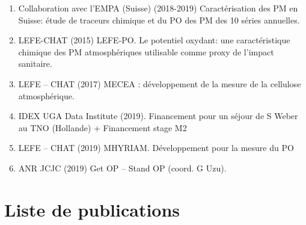 \documentclass[a4paper,11pt]{book}
\begin{document}
\begin{enumerate}
    \item Collaboration avec l’EMPA (Suisse) (2018-2019) Caractérisation des PM en Suisse: étude de traceurs chimique et du PO des PM des 10 séries annuelles. 
    \item LEFE-CHAT (2015) LEFE-PO. Le potentiel oxydant: une caractéristique chimique des PM atmosphériques utilisable comme proxy de l’impact sanitaire. 
    \item LEFE – CHAT (2017) MECEA : développement de la mesure de la cellulose atmosphérique.
    \item IDEX UGA Data Institute (2019). Financement pour un séjour de S Weber au TNO (Hollande) + Financement stage M2
    \item LEFE – CHAT (2019) MHYRIAM. Développement pour la mesure du PO 
    \item ANR JCJC (2019) Get OP – Stand OP (coord. G Uzu). 
\end{enumerate}


\section{Liste de publications}
\label{annexe:CV}



\end{document}
